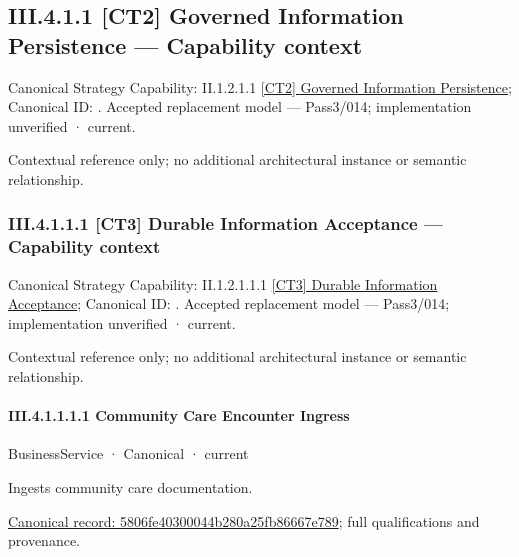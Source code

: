 \subsection*{III.4.1.1 [CT2] Governed Information Persistence — Capability context}
\label{navigation:III.4.1.1}

{\small Canonical Strategy Capability: II.1.2.1.1 \hyperref[element:05b64d34d550432a814485ab0c0dafcd]{[CT2] Governed Information Persistence}; Canonical ID: \texttt{}. Accepted replacement model — Pass3/014; implementation unverified · current.}\par
Contextual reference only; no additional architectural instance or semantic relationship.\par
\subsubsection*{III.4.1.1.1 [CT3] Durable Information Acceptance — Capability context}
\label{navigation:III.4.1.1.1}

{\small Canonical Strategy Capability: II.1.2.1.1.1 \hyperref[element:243b80f04f2542c8b0e63af2075b5a60]{[CT3] Durable Information Acceptance}; Canonical ID: \texttt{}. Accepted replacement model — Pass3/014; implementation unverified · current.}\par
Contextual reference only; no additional architectural instance or semantic relationship.\par
\paragraph*{III.4.1.1.1.1 Community Care Encounter Ingress}
\label{navigation:III.4.1.1.1.1}

\label{element:5806fe40300044b280a25fb86667e789}
{\small BusinessService · Canonical · current}\par

Ingests community care documentation.


{\footnotesize \href{../../../../../../../../continuum/business/business-service/5806fe40300044b280a25fb86667e789.md}{Canonical record: 5806fe40300044b280a25fb86667e789}; full qualifications and provenance.}\par
